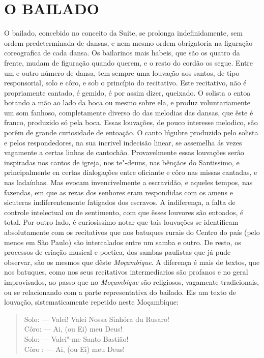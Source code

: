\section*{O BAILADO}

O bailado, concebido no conceito da Suite, se prolonga indefinidamente,
sem ordem predeterminada de dansas, e nem mesmo ordem obrigatoria na
figuração coreografica de cada dansa. Os bailarinos mais habeis, que são
os quatro da frente, mudam de figuração quando querem, e o resto do
cordão os segue. Entre um e outro número de dansa, tem sempre uma
louvação aos santos, de tipo responsorial, solo e côro, e sob o
princípio do recitativo. Este recitativo, não é propriamente cantado, é
gemido, é por assim dizer, queixado. O solista o entoa botando a mão ao
lado da boca ou mesmo sobre ela, e produz voluntariamente um som
fanhoso, completamente diverso do das melodias das dansas, que êste é
franco, produzido só pela boca. Essas louvações, de pouco interesse
melodico, são porêm de grande curiosidade de entoação. O canto lúgubre
produzido pelo solista e pelos respondedores, na sua incrivel indecisão
linear, se assemelha ás vezes vagamente a certas linhas de cantochão.
Provavelmente essas louvações serão inspiradas nos cantos de igreja, nos
te"-deuns, nas bênçãos do Santissimo, e principalmente en certas
dialogações entre oficiante e côro nas missas cantadas, e nas ladaínhas.
Mas evocam invencivelmente a escravidão, e aqueles tempos, nas fazendas,
em que as rezas dos senhores eram respondidas com os amens e sicuteras
indiferentemente fatigados dos escravos. A indiferença, a falta de
controle intelectual ou de sentimento, com que êsses louvores são
entoados, é total. Por outro lado, é curiosissimo notar que tais
louvações se identificam absolutamente com os recitativos que nos
batuques rurais do Centro do país (pelo menos em São Paulo) são
intercalados entre um samba e outro. De resto, os processos de criação
musical e poetica, dos sambas paulistas que já pude observar, são os
mesmos que dêste \emph{Moçambique}. A diferença é mais de textos, que
nos batuques, como nos seus recitativos intermediarios são profanos e no
geral improvisados, ao passo que no \emph{Moçambique} são religiosos,
vagamente tradicionais, ou se relacionando com a parte representativa do
bailado. Eis um texto de louvação, sistematicamente repetido neste
Moçambique:

\begin{verse}
Solo: --- Valei! Valei Nossa Sinhóra du Rusaro!\\
Côro: --- Ai, (ou Ei) meu Deus!\\
Solo: --- Valei"-me Santo Bastião!\\
Côro : --- Ai, (ou Ei) meu Deus!
\end{verse}

